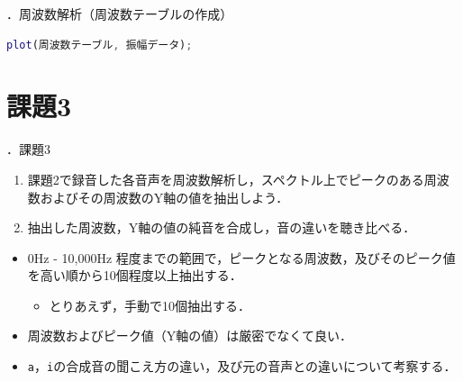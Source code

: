 \documentclass[aspectratio=43]{beamer}
\newcommand{\showsec}{\thesection ．}
\begin{document}
\begin{frame}[t,containsverbatim]{\showsec 周波数解析（周波数テーブルの作成）}
    \begin{lstlisting}[language={Matlab},frame={lines},xleftmargin={0mm}]
plot(周波数テーブル, 振幅データ);
    \end{lstlisting}
    \begin{figure}
        \centering
    \end{figure}
\end{frame}
\section{課題3}
\begin{frame}[t]{\showsec 課題3}
    \begin{exampleblock}{}
        \begin{enumerate}
            \item 課題2で録音した各音声を周波数解析し，スペクトル上でピークのある周波数およびその周波数のY軸の値を抽出しよう．
            \item 抽出した周波数，Y軸の値の純音を合成し，音の違いを聴き比べる．
        \end{enumerate}
    \end{exampleblock}
    \dotfill
    \begin{itemize}
        \item 0Hz - 10,000Hz 程度までの範囲で，ピークとなる周波数，及びそのピーク値を高い順から10個程度以上抽出する．\\
              \begin{itemize}
                  \item とりあえず，手動で10個抽出する．
              \end{itemize}
        \item 周波数およびピーク値（Y軸の値）は厳密でなくて良い．
        \item \texttt{a}，\texttt{i}の合成音の聞こえ方の違い，及び元の音声との違いについて考察する．
    \end{itemize}
\end{frame}
\end{document}
